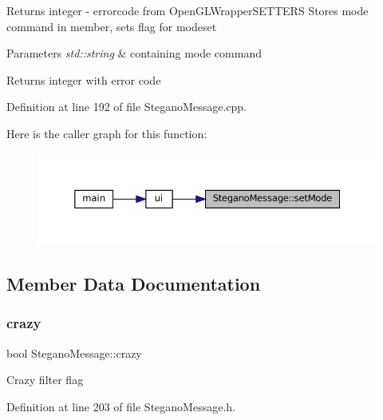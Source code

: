 \begin{DoxyReturn}{Returns}
integer -\/ errorcode from Open\+G\+L\+Wrapper\+S\+E\+T\+T\+E\+RS Stores mode command in member, sets flag for modeset 
\end{DoxyReturn}

\begin{DoxyParams}{Parameters}
{\em std\+::string} & containing mode command \\
\hline
\end{DoxyParams}
\begin{DoxyReturn}{Returns}
integer with error code 
\end{DoxyReturn}


Definition at line 192 of file Stegano\+Message.\+cpp.

Here is the caller graph for this function\+:\nopagebreak
\begin{figure}[H]
\begin{center}
\leavevmode
\includegraphics[width=350pt]{classSteganoMessage_a3e06a73baa5744b5eb9152f4ae65f458_icgraph}
\end{center}
\end{figure}


\subsection{Member Data Documentation}
\mbox{\label{classSteganoMessage_aa66c9e1d0367981d42ede819e1a51131}} 
\subsubsection{\texorpdfstring{crazy}{crazy}}
{\footnotesize\ttfamily bool Stegano\+Message\+::crazy\hspace{0.3cm}{\ttfamily [private]}}

Crazy filter flag 

Definition at line 203 of file Stegano\+Message.\+h.

\mbox{\label{classSteganoMessage_a26b631e00716be7a89cbcf22cf0b7291}} 
